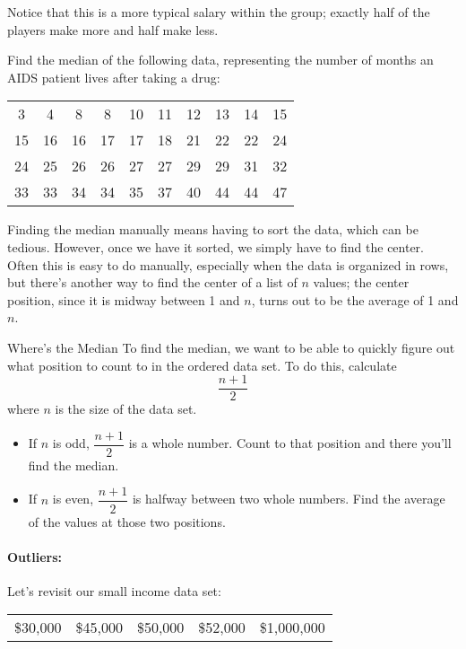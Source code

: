 Notice that this is a more typical salary within the group; exactly half of the players make more and half make less.

\begin{try}
Find the median of the following data, representing the number of months an AIDS patient lives after taking a drug:
\begin{center}
\begin{tabular}{c c c c c c c c c c}
3 & 4 & 8 & 8 & 10 & 11 & 12 & 13 & 14 & 15\\
15 & 16 & 16 & 17 & 17 & 18 & 21 & 22 & 22 & 24\\
24 & 25 & 26 & 26 & 27 & 27 & 29 & 29 & 31 & 32\\
33 & 33 & 34 & 34 & 35 & 37 & 40 & 44 & 44 & 47\\
\end{tabular}
\end{center}
\end{try}

Finding the median manually means having to sort the data, which can be tedious.  However, once we have it sorted, we simply have to find the center.  Often this is easy to do manually, especially when the data is organized in rows, but there's another way to find the center of a list of $n$ values; the center position, since it is midway between 1 and $n$, turns out to be the average of 1 and $n$.
\vfill
\pagebreak

\begin{proc}{Where's the Median}
To find the median, we want to be able to quickly figure out what position to count to in the ordered data set.  To do this, calculate \[\dfrac{n+1}{2}\] where $n$ is the size of the data set.
\end{proc}

\begin{itemize}
\item If $n$ is odd, $\dfrac{n+1}{2}$ is a whole number.  Count to that position and there you'll find the median.
\item If $n$ is even, $\dfrac{n+1}{2}$ is halfway between two whole numbers.  Find the average of the values at those two positions.
\end{itemize}

\paragraph{Outliers:} Let's revisit our small income data set:
\begin{center}
\begin{tabular}{c c c c c}
\$30,000 & \$45,000 & \$50,000 & \$52,000 & \$1,000,000
\end{tabular}
\end{center}

